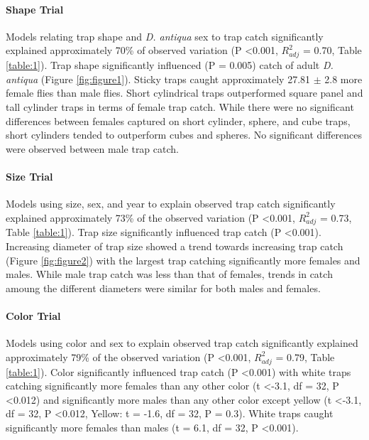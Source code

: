 \documentclass[alpha-refs]{wiley-article}
\begin{document}
\paragraph{Shape Trial} Models relating trap shape and \textit{D. antiqua} sex to trap catch significantly explained approximately 70\% of observed variation (P \textless 0.001, $R^2_{adj}$ = 0.70, Table \ref{table:1}).  Trap shape significantly influenced (P = 0.005) catch of adult \textit{D. antiqua} (Figure \ref{fig:figure1}).  Sticky traps caught approximately 27.81 $\pm$ 2.8 more female flies than male flies.  Short cylindrical traps outperformed square panel and tall cylinder traps in terms of female trap catch.  While there were no significant differences between females captured on short cylinder, sphere, and cube traps, short cylinders tended to outperform cubes and spheres.  No significant differences were observed between male trap catch.  


\paragraph{Size Trial} Models using size, sex, and year to explain observed trap catch significantly explained approximately 73\% of the observed variation (P \textless 0.001, $R^2_{adj}$ = 0.73, Table \ref{table:1}).  Trap size significantly influenced trap catch (P \textless 0.001).  Increasing diameter of trap size showed a trend towards increasing trap catch (Figure \ref{fig:figure2}) with the largest trap catching significantly more females and males.  While male trap catch was less than that of females, trends in catch amoung the different diameters were similar for both males and females.  


\paragraph{Color Trial} Models using color and sex to explain observed trap catch significantly explained approximately 79\% of the observed variation (P \textless 0.001, $R^2_{adj}$ = 0.79, Table \ref{table:1}). Color significantly influenced trap catch (P \textless 0.001) with white traps catching significantly more females than any other color (t \textless -3.1, df = 32, P \textless 0.012) and significantly more males than any other color except yellow (t \textless -3.1, df = 32, P \textless 0.012, Yellow: t = -1.6, df = 32, P = 0.3).  White traps caught significantly more females than males (t = 6.1, df = 32, P \textless 0.001).
\end{document}
